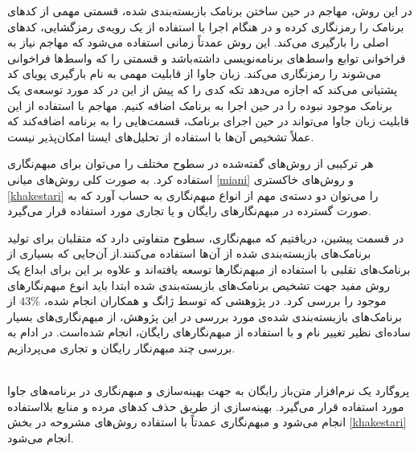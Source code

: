  در این روش، مهاجم در حین ساختن برنامک‌ بازبسته‌بندی شده، قسمتی مهمی از کد‌های برنامک را رمز‌نگاری کرده و در هنگام اجرا با استفاده از یک رویه‌ی رمز‌گشایی، کد‌های اصلی را بارگیری می‌کند. این روش عمدتاً زمانی استفاده می‌شود که مهاجم نیاز به فراخوانی توابع واسط‌های برنامه‌نویسی داشته‌باشد و قسمتی را که واسط‌ها فراخوانی می‌شوند را رمزنگاری می‌کند.
 زبان جاوا از قابلیت مهمی به نام بارگیری پویا‌ی کد پشتیانی می‌کند که اجازه می‌دهد تکه کدی را که پیش از این در کد مورد توسعه‌ی یک برنامک موجود نبوده را در حین اجرا به برنامک اضافه کنیم. مهاجم با استفاده از این قابلیت زبان‌ جاوا می‌تواند در حین اجرای برنامک، قسمت‌هایی را به برنامه اضافه‌کند که عملاً تشخیص آن‌ها با استفاده از تحلیل‌های ایستا امکان‌‌پذیر نیست.

هر ترکیبی از روش‌های گفته‌شده در سطوح مختلف را می‌توان برای مبهم‌نگاری استفاده کرد. به صورت کلی روش‌های میانی 
\ref{miani}
و روش‌های خاکستری
\ref{khakestari}
را می‌توان دو دسته‌ی مهم از انواع مبهم‌نگاری به حساب آورد که به صورت گسترده در مبهم‌نگار‌های رایگان و یا تجاری مورد استفاده قرار می‌گیرد.



در قسمت پیشین، دریافتیم که مبهم‌نگاری، سطوح متفاوتی دارد که متقلبان برای تولید برنامک‌های بازبسته‌بندی شده از آن‌ها استفاده می‌کنند.از آن‌جایی که بسیاری از برنامک‌های تقلبی با استفاده از مبهم‌نگار‌ها توسعه‌ یافته‌اند و علاوه بر این برای ابداع یک روش مفید جهت تشخیص برنامک‌های بازبسته‌بندی شده ابتدا باید انوع مبهم‌نگار‌های موجود را بررسی کرد. در پژوهشی که توسط ژانگ و همکاران انجام ‌شده،
$43\%$
از برنامک‌های بازبسته‌بندی شده‌ی مورد بررسی در این پژوهش، از مبهم‌نگاری‌های بسیار ساده‌ای نظیر تغییر نام و با استفاده از مبهم‌نگار‌های رایگان، انجام شده‌است. در ادام به بررسی چند مبهم‌نگار رایگان و تجاری می‌پردازیم. 

 \\
پروگارد یک نرم‌افزار متن‌باز رایگان به جهت بهینه‌سازی و مبهم‌نگاری در برنامه‌های جاوا مورد استفاده قرار می‌گیرد. بهینه‌سازی از طریق حذف کد‌های مرده و منابع بلااستفاده انجام می‌شود و مبهم‌نگاری عمدتاً با استفاده روش‌‌های مشروحه در بخش 
\ref{khakestari}
انجام می‌شود.

